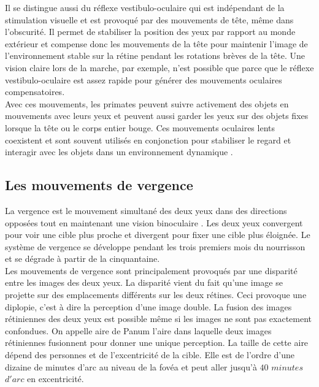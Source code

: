 Il se distingue aussi du réflexe vestibulo-oculaire qui est indépendant de la stimulation visuelle et est provoqué par des mouvements de tête, même dans l'obscurité. Il permet de stabiliser la position des yeux par rapport au monde extérieur et compense donc les mouvements de la tête pour maintenir l'image de l'environnement stable sur la rétine pendant les rotations brèves de la tête. Une vision claire lors de la marche, par exemple, n'est possible que parce que le réflexe vestibulo-oculaire est assez rapide pour générer des mouvements oculaires compensatoires\cite{Grossman:1988}. \\

Avec ces mouvements, les primates peuvent suivre activement des objets en mouvements avec leurs yeux et peuvent aussi garder les yeux sur des objets fixes lorsque la tête ou le corps entier bouge. Ces mouvements oculaires lents coexistent et sont souvent utilisés en conjonction pour stabiliser le regard et interagir avec les objets dans un environnement dynamique \cite{Leigh:1987,Paige:1983,Yee:1983}.\\

\subsection{Les mouvements de vergence}

La vergence est le mouvement simultané des deux yeux dans des directions opposées tout en maintenant une vision binoculaire \cite{Cassin:1990}. Les deux yeux convergent pour voir une cible plus proche et divergent pour fixer une cible plus éloignée. Le système de vergence se développe pendant les trois premiers mois du nourrisson et se dégrade à partir de la cinquantaine. \\

Les mouvements de vergence sont principalement provoqués par une disparité entre les images des deux yeux. La disparité vient du fait qu'une image se projette sur des emplacements différents sur les deux rétines. Ceci provoque une diplopie, c'est à dire la perception d'une image double. La fusion des images rétiniennes des deux yeux est possible même si les images ne sont pas exactement confondues. On appelle aire de Panum l'aire dans laquelle deux images rétiniennes fusionnent pour donner une unique perception. La taille de cette aire dépend des personnes et de l'excentricité de la cible. Elle est de l'ordre d'une dizaine de minutes d'arc au niveau de la fovéa et peut aller jusqu'à $40$ $minutes$ $d'arc$ en excentricité.\\


